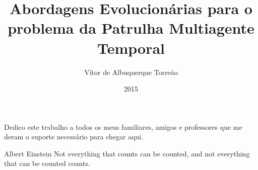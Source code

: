 \documentclass[pt,oneside,onehalfspacing,bsc]{risethesis}
\title{Abordagens Evolucionárias para o problema da Patrulha Multiagente Temporal}
\date{2015}
\author{Vítor de Albuquerque Torreão}
\begin{document}
\frontmatter

\frontpage

\begin{fichacatalografica}
	\FakeFichaCatalografica %
\end{fichacatalografica}

\presentationpage

\banca

\begin{dedicatory}
	Dedico este trabalho a todos os meus familiares, amigos e professores que
	me deram o suporte necessário para chegar aqui.
\end{dedicatory}

\acknowledgements


\begin{epigraph}[]{Albert Einstein}
Not everything that counts can be counted, and not everything that can be counted counts.
\end{epigraph}

\resumo


\abstract


\listoffigures

\listoftables

\listofalgorithms

\listofacronyms


\tableofcontents

\mainmatter









\begin{references}
  
\end{references}


%
\end{document}
